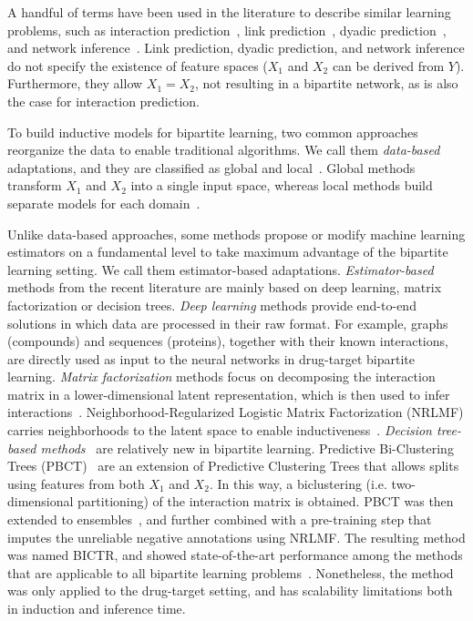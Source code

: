 \documentclass[letterpaper]{article}
\begin{document}
A handful of terms have been used in the literature to describe similar learning problems,
such as interaction prediction~\cite{schrynemackers_classifying_2015,pliakos_network_2019,chen_machine_2018,bagherian_machine_2020}, link prediction~\cite{lu_link_2011,zhou_progresses_2021}, dyadic prediction~\cite{menon_log-linear_2010,pahikkala_two-step_2014,jin_multitask_2017}, and network inference~\cite{park_flaws_2012,pahikkala_toward_2015,schrynemackers_protocols_2013,pliakos_network_2019}.
Link prediction, dyadic prediction, and network inference do not specify the existence of feature spaces ($X_1$ and $X_2$ can be derived from $Y$). Furthermore, they allow $X_1 = X_2$, not resulting in a bipartite network, as is also the case for interaction prediction.

To build inductive models for bipartite learning,
two common approaches reorganize the data to enable traditional algorithms. We call them \emph{data-based} adaptations, and they are classified as global and local~\cite{schrynemackers_classifying_2015}.
Global methods transform $X_1$ and $X_2$ into a single input space, whereas local methods build separate models for each domain~\cite{schrynemackers_classifying_2015}.

Unlike data-based approaches, some methods propose or modify machine learning estimators on a fundamental level to take maximum advantage of the bipartite learning setting.
We call them estimator-based adaptations.
\emph{Estimator-based} methods from the recent literature are mainly based on deep learning, matrix factorization or decision trees.
\emph{Deep learning} methods provide end-to-end solutions in which data are processed in their raw format. For example, graphs (compounds) and sequences (proteins), together with their known interactions, are directly used as input to the neural networks in drug-target bipartite learning.
\emph{Matrix factorization} methods focus on decomposing the interaction matrix in a lower-dimensional latent representation, which is then used to infer interactions~\cite{guo2024rise,chen2022review}. Neighborhood-Regularized Logistic Matrix Factorization (NRLMF) carries neighborhoods to the latent space to enable inductiveness~\cite{liu_neighborhood_2016,liu_lpi-nrlmf_2017,liu_predicting_2020}.
\emph{Decision tree-based methods}~\cite{costa2023recent,blockeel2023decision} are relatively new in bipartite learning. Predictive Bi-Clustering Trees (PBCT)~\cite{pliakos_global_2018} are an extension of Predictive Clustering Trees \cite{blockeel1998top} that allows splits using features from both $X_1$ and $X_2$.
In this way, a biclustering (i.e. two-dimensional partitioning) of the interaction matrix is obtained.
PBCT was then extended to ensembles~\cite{pliakos_network_2019}, and further combined with a pre-training step that imputes the unreliable negative annotations using NRLMF.
The resulting method was named BICTR, and showed state-of-the-art performance among the methods that are applicable to all bipartite learning problems~\cite{pliakos_drug-target_2020}.
Nonetheless, the method was only applied to the drug-target setting, and has scalability limitations both in induction and inference time. 
\end{document}
